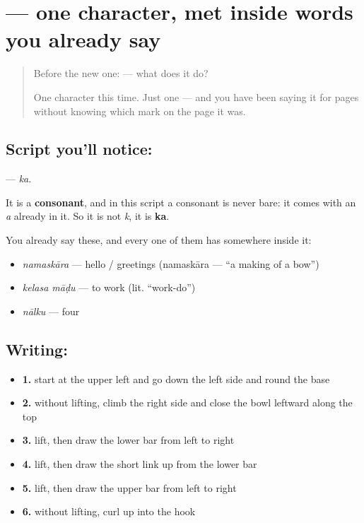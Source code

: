 \section[\texorpdfstring{\kn{ಕ} (ka)}{ಕ (ka)}]{ — one character, met inside words you already say}

\label{lesson:KA-S116-letter-ka}



\begin{quote}
Before the new one:  — what does it do?

One character this time. Just one — and you have been saying it for pages without knowing which mark on the page it was.
\end{quote}

\subsection*{Script you'll notice: }
\textbf{} — \emph{ka}.

It is a \textbf{consonant}, and in this script a consonant is never bare: it comes with an \emph{a} already in it. So it is not \emph{k}, it is \textbf{ka}.

You already say these, and every one of them has  somewhere inside it:

\begin{itemize}
\raggedright
  \item \textbf{} \emph{namaskāra} — hello / greetings (namaskāra — \textquotedblleft{}a making of a bow\textquotedblright{})
  \item \textbf{ } \emph{kelasa māḍu} — to work (lit. \textquotedblleft{}work-do\textquotedblright{})
  \item \textbf{} \emph{nālku} — four
\end{itemize}

\subsection*{Writing: }

\begin{itemize}
\raggedright
  \item \textbf{1.} start at the upper left and go down the left side and round the base
  \item \textbf{2.} without lifting, climb the right side and close the bowl leftward along the top
  \item \textbf{3.} lift, then draw the lower bar from left to right
  \item \textbf{4.} lift, then draw the short link up from the lower bar
  \item \textbf{5.} lift, then draw the upper bar from left to right
  \item \textbf{6.} without lifting, curl up into the hook
\end{itemize}

